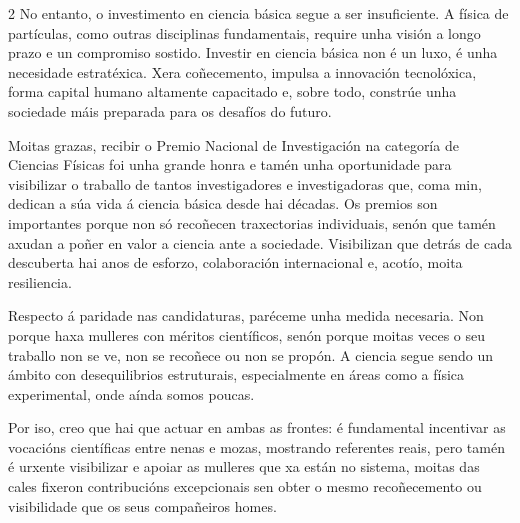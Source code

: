 \begin{multicols}{2}
No entanto, o investimento en ciencia básica segue a ser insuficiente. A física
de partículas, como outras disciplinas fundamentais, require unha visión a
longo prazo e un compromiso sostido. Investir en ciencia básica non é un luxo,
é unha necesidade estratéxica. Xera coñecemento, impulsa a innovación
tecnolóxica, forma capital humano altamente capacitado e, sobre todo, constrúe
unha sociedade máis preparada para os desafíos do futuro.


Moitas grazas, recibir o Premio Nacional de Investigación na categoría de
Ciencias Físicas foi unha grande honra e tamén unha oportunidade para
visibilizar o traballo de tantos investigadores e investigadoras que, coma min,
dedican a súa vida á ciencia básica desde hai décadas. Os premios son
importantes porque non só recoñecen traxectorias individuais, senón que tamén
axudan a poñer en valor a ciencia ante a sociedade. Visibilizan que detrás de
cada descuberta hai anos de esforzo, colaboración internacional e, acotío,
moita resiliencia.

Respecto á paridade nas candidaturas, paréceme unha medida necesaria. Non
porque haxa mulleres con méritos científicos, senón porque moitas veces o seu
traballo non se ve, non se recoñece ou non se propón. A ciencia segue sendo un
ámbito con desequilibrios estruturais, especialmente en áreas como a física
experimental, onde aínda somos poucas.

Por iso, creo que hai que actuar en ambas as frontes: é fundamental incentivar
as vocacións científicas entre nenas e mozas, mostrando referentes reais, pero
tamén é urxente visibilizar e apoiar as mulleres que xa están no sistema,
moitas das cales fixeron contribucións excepcionais sen obter o mesmo
recoñecemento ou visibilidade que os seus compañeiros homes.



\end{multicols}
